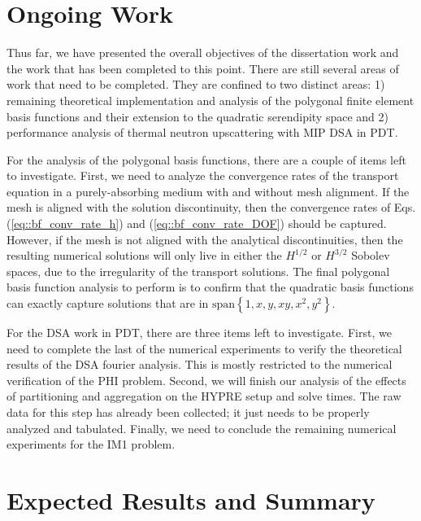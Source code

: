 \documentclass[11pt]{article}
\begin{document}
\section{Ongoing Work}
\label{sec::OW}

Thus far, we have presented the overall objectives of the dissertation work and the work that has been completed to this point. There are still several areas of work that need to be completed. They are confined to two distinct areas: 1) remaining theoretical implementation and analysis of the polygonal finite element basis functions and their extension to the quadratic serendipity space and 2) performance analysis of thermal neutron upscattering with  MIP DSA in PDT.

For the analysis of the polygonal basis functions, there are a couple of items left to investigate. First, we need to analyze the convergence rates of the transport equation in a purely-absorbing medium with and without mesh alignment. If the mesh is aligned with the solution discontinuity, then the convergence rates of Eqs. (\ref{eq::bf_conv_rate_h}) and (\ref{eq::bf_conv_rate_DOF}) should be captured. However, if the mesh is not aligned with the analytical discontinuities, then the resulting numerical solutions will only live in either the $H^{1/2}$ or $H^{3/2}$ Sobolev spaces, due to the irregularity of the transport solutions. The final polygonal basis function analysis to perform is to confirm that the quadratic basis functions can exactly capture solutions that are in $\text{span}\left\{  1,x,y,xy,x^2,y^2  \right\}$.

For the DSA work in PDT, there are three items left to investigate. First, we need to complete the last of the numerical experiments to verify the theoretical results of the DSA fourier analysis. This is mostly restricted to the numerical verification of the PHI problem. Second, we will finish our analysis of the effects of partitioning and aggregation on the HYPRE setup and solve times. The raw data for this step has already been collected; it just needs to be properly analyzed and tabulated. Finally, we need to conclude the remaining numerical experiments for the IM1 problem.

\newpage
\section{Expected Results and Summary}
\label{sec::ER}
\end{document}
